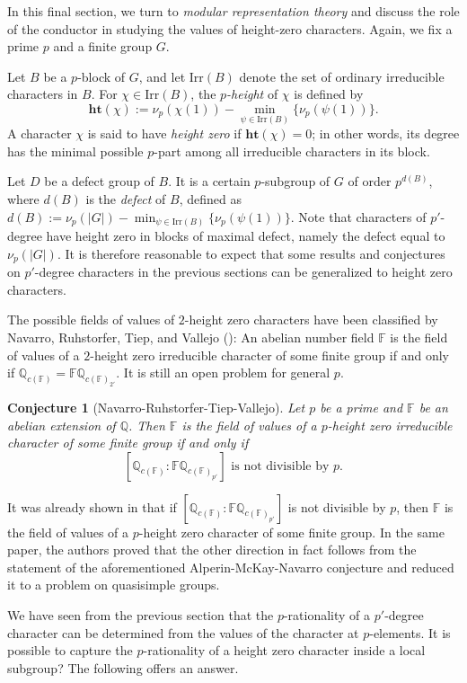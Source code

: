\documentclass[12pt]{amsart}
\newtheorem{conjecture}[theorem]{Conjecture}
\theoremstyle{definition}
\numberwithin{equation}{section}
\newcommand{\Irr}{{\mathrm {Irr}}}
\newcommand{\QQ}{{\mathbb Q}}
\newcommand{\FF}{{\mathbb F}}
\newcommand{\height}{\mathbf{ht}}
\begin{document}
In this final section, we turn to \emph{modular representation
theory} and discuss the role of the conductor in studying the values
of height-zero characters. Again, we fix a prime $p$ and a finite
group $G$.

Let $B$ be a $p$-block of $G$, and let $\Irr(B)$ denote the set of
ordinary irreducible characters in $B$. For $\chi \in \Irr(B)$, the
\emph{$p$-height} of $\chi$ is defined by
\[
\height(\chi) := \nu_p(\chi(1)) - \min_{\psi \in \Irr(B)}
\{\nu_p(\psi(1))\}.
\]
A character $\chi$ is said to have \emph{height zero} if
$\height(\chi) = 0$; in other words, its degree has the minimal
possible $p$-part among all irreducible characters in its block.

Let $D$ be a defect group of $B$. It is a certain $p$-subgroup of
$G$ of order $p^{d(B)}$, where $d(B)$ is the \emph{defect} of $B$,
defined as $d(B) := \nu_p(|G|) - \min_{\psi \in \Irr(B)}
\{\nu_p(\psi(1))\}$. Note that characters of $p'$-degree have height
zero in blocks of maximal defect, namely the defect equal to
$\nu_p(|G|)$. It is therefore reasonable to expect that some results
and conjectures on $p'$-degree characters in the previous sections
can be generalized to height zero characters.


The possible fields of values of $2$-height zero characters have
been classified by Navarro, Ruhstorfer, Tiep, and Vallejo
(\cite[Theorem~B]{NRTV24}): An abelian number field $\FF$ is the
field of values of a $2$-height zero irreducible character of some
finite group if and only if $\QQ_{c(\FF)}=\FF\QQ_{c(\FF)_{2'}}$. It
is still an open problem for general $p$.

\begin{conjecture}[Navarro-Ruhstorfer-Tiep-Vallejo]
Let $p$ be a prime and $\FF$ be an abelian extension of $\QQ$. Then
$\FF$ is the field of values of a $p$-height zero irreducible
character of some finite group if and only if
\[ [\QQ_{c(\FF)} : \FF\QQ_{c(\FF)_{p'}}] \text{ is not divisible by } p.\]
\end{conjecture}

It was already shown in \cite[Theorem~5.1]{NRTV24} that if
$[\QQ_{c(\FF)} : \FF\QQ_{c(\FF)_{p'}}]$ is not divisible by $p$,
then $\FF$ is the field of values of a $p$-height zero character of
some finite group. In the same paper, the authors proved that the
other direction in fact follows from the statement of the
aforementioned Alperin-McKay-Navarro conjecture and reduced it to a
problem on quasisimple groups.

We have seen from the previous section that the $p$-rationality of a
$p'$-degree character can be determined from the values of the
character at $p$-elements. It is possible to capture the
$p$-rationality of a height zero character inside a local subgroup?
The following offers an answer.
\end{document}
